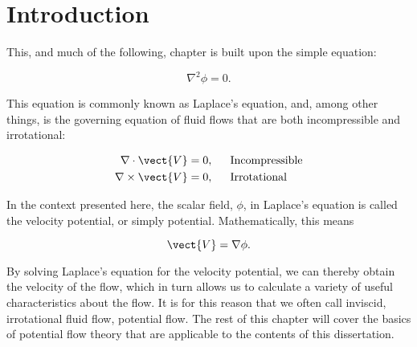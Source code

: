 \section{Introduction}
\label{sec:potentialflowintro}

This, and much of the following, chapter is built upon the simple equation:

\[\nabla^2\phi=0.\]

\noindent This equation is commonly known as Laplace's equation, and, among other things, is the governing equation of fluid flows that are both incompressible and irrotational:

\[
\begin{aligned}
	\nabla\cdot\vect{V} = 0,&~~~~~\mathrm{Incompressible}\\
	\nabla\times\vect{V} = 0,&~~~~~\mathrm{Irrotational}
\end{aligned}
\]

\noindent In the context presented here, the scalar field, \(\phi\), in Laplace's equation is called the velocity potential, or simply potential.
Mathematically, this means

\[\vect{V} = \nabla \phi.\]

\noindent By solving Laplace's equation for the velocity potential, we can thereby obtain the velocity of the flow, which in turn allows us to calculate a variety of useful characteristics about the flow.
It is for this reason that we often call inviscid, irrotational fluid flow, potential flow.
The rest of this chapter will cover the basics of potential flow theory that are applicable to the contents of this dissertation.



